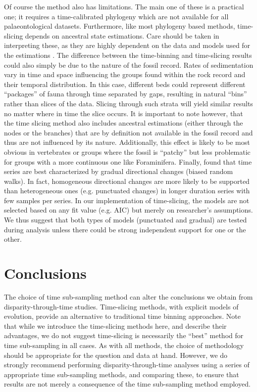 \documentclass[12pt,a4paper]{article}
\begin{document}
Of course the method also has limitations.
The main one of these is a practical one; it requires a time-calibrated phylogeny which are not available for all palaeontological datasets.
Furthermore, like most phylogeny based methods, time-slicing depends on ancestral state estimations.
Care should be taken in interpreting these, as they are highly dependent on the data and models used for the estimations \citep{Slateretal2012,doi:10.1080/10635150801910451}.
The difference between the time-binning and time-slicing results could also simply be due to the nature of the fossil record.
Rates of sedimentation vary in time and space influencing the groups found within the rock record and their temporal distribution. 
In this case, different beds could represent different ``packages'' of fauna through time separated by gaps, resulting in natural ``bins'' rather than slices of the data.
Slicing through such strata will yield similar results no matter where in time the slice occurs.
It is important to note however, that the time slicing method also includes ancestral estimations (either through the nodes or the branches) that are by definition not available in the fossil record and thus are not influenced by its nature.
Additionally, this effect is likely to be most obvious in vertebrates or groups where the fossil is ``patchy'' but less problematic for groups with a more continuous one like Foraminifera.
Finally, \cite{Hunt21042015} found that time series are best characterized by gradual directional changes (biased random walks).
In fact, homogeneous directional changes are more likely to be supported than heterogeneous ones (e.g. punctuated changes) in longer duration series with few samples per series.
In our implementation of time-slicing, the models are not selected based on any fit value (e.g. AIC) but merely on researcher's assumptions.
We thus suggest that both types of models (punctuated and gradual) are tested during analysis unless there could be strong independent support for one or the other.


\section{Conclusions}
The choice of time sub-sampling method can alter the conclusions we obtain from disparity-through-time studies. 
Time-slicing methods, with explicit models of evolution, provide an alternative to traditional time binning approaches.
Note that while we introduce the time-slicing methods here, and describe their advantages, we do not suggest time-slicing is necessarily the ``best'' method for time sub-sampling in all cases. 
As with all methods, the choice of methodology should be appropriate for the question and data at hand.
However, we do strongly recommend performing disparity-through-time analyses using a series of appropriate time sub-sampling methods, and comparing these, to ensure that results are not merely a consequence of the time sub-sampling method employed. 
\end{document}
